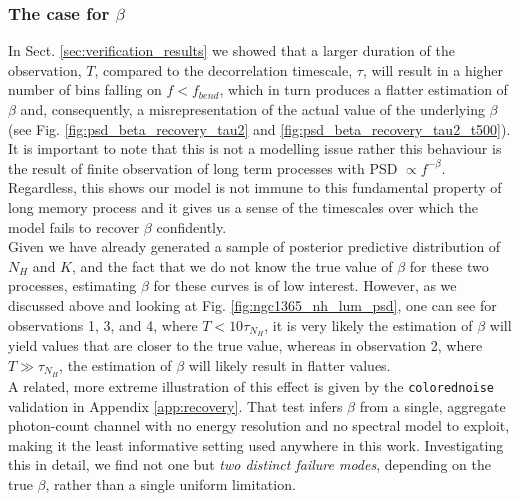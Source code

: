 \documentclass{aa}
\begin{document}
\subsubsection{The case for $\beta$}
In Sect. \ref{sec:verification_results} we showed that a larger duration of the observation, $T$, compared to the decorrelation timescale, $\tau$, will result in a higher number of bins falling on $ f < f_{bend}$, which in turn produces a flatter estimation of $\beta$ and, consequently, a misrepresentation of the actual value of the underlying $\beta$ (see Fig. \ref{fig:psd_beta_recovery_tau2} and \ref{fig:psd_beta_recovery_tau2_t500}). It is important to note that this is not a modelling issue rather this behaviour is the result of finite observation of long term processes with PSD $\propto f^{-\beta}$. Regardless, this shows our model is not immune to this fundamental property of long memory process and it gives us a sense of the timescales over which the model fails to recover $\beta$ confidently. \\
Given we have already generated a sample of posterior predictive distribution of $N_H$ and $K$, and the fact that we do not know the true value of $\beta$ for these two processes, estimating $\beta$ for these curves is of low interest. However, as we discussed above and looking at Fig. \ref{fig:ngc1365_nh_lum_psd}, one can see for observations 1, 3, and 4, where $T < 10\tau_{N_H}$, it is very likely the estimation of $\beta$ will yield values that are closer to the true value, whereas in observation 2, where $T \gg \tau_{N_H}$, the estimation of $\beta$ will likely result in flatter values. \\
A related, more extreme illustration of this effect is given by the \texttt{colorednoise} validation in Appendix \ref{app:recovery}. That test infers $\beta$ from a single, aggregate photon-count channel with no energy resolution and no spectral model to exploit, making it the least informative setting used anywhere in this work. Investigating this in detail, we find not one but \emph{two distinct failure modes}, depending on the true $\beta$, rather than a single uniform limitation. \\
\end{document}
